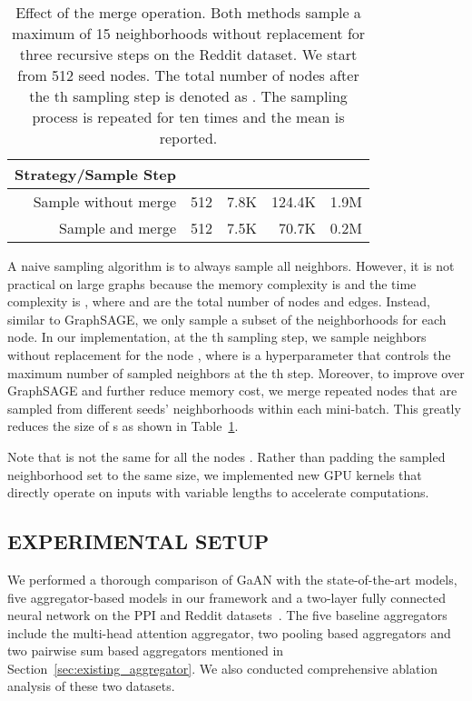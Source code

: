 \documentclass{article}
\begin{document}
	
	\begin{table}[tb!]
		\centering
		\caption{Effect of the merge operation. Both methods sample a maximum of 15 neighborhoods without replacement for three recursive steps on the Reddit dataset. We start from 512 seed nodes. The total number of nodes after the th sampling step is denoted as . The sampling process is repeated for ten times and the mean is reported.}
		\begin{tabular}{|r | rrrr|}
			\hline
			Strategy/Sample Step  &  &  &  &  \\
			\hline
			Sample without merge & 512 & 7.8K & 124.4K & 1.9M   \\ Sample and merge     & 512 & 7.5K & 70.7K  & 0.2M    \\  \hline
		\end{tabular}
\label{tab:sample_and_merge}
	\end{table}
	A naive sampling algorithm is to always sample all neighbors. However, it is not practical on large graphs because the memory complexity is  and the time complexity is , where  and  are the total number of nodes and edges. Instead, similar to GraphSAGE, we only sample a subset of the neighborhoods for each node. In our implementation, at the th sampling step, we sample  neighbors without replacement for the node , where  is a hyperparameter that controls the maximum number of sampled neighbors at the th step. Moreover, to improve over GraphSAGE and further reduce memory cost, we merge repeated nodes that are sampled from different seeds' neighborhoods within each mini-batch. This greatly reduces the size of s as shown in Table~\ref{tab:sample_and_merge}.
	
	Note that  is not the same for all the nodes . Rather than padding the sampled neighborhood set to the same size, we implemented new GPU kernels that directly operate on inputs with variable lengths to accelerate computations.
	
\subsection{EXPERIMENTAL SETUP}\label{sec:exp}
	
	We performed a thorough comparison of GaAN with the state-of-the-art models, five aggregator-based models in our framework and a two-layer fully connected neural network on the PPI and Reddit datasets~\citep{hamilton2017inductive}. The five baseline aggregators include the multi-head attention aggregator, two pooling based aggregators and two pairwise sum based aggregators mentioned in Section~\ref{sec:existing_aggregator}. We also conducted comprehensive ablation analysis of these two datasets.
	
\end{document}
